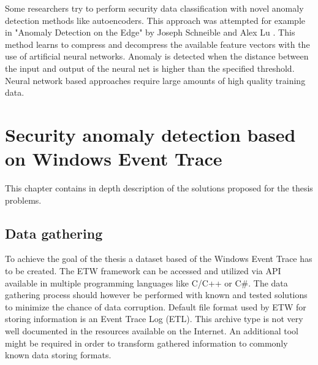 \documentclass[a4paper,twoside,12pt]{book}
\begin{document}
Some researchers try to perform security
data classification with novel anomaly detection methods like autoencoders. This approach was
attempted for example in "Anomaly Detection on the Edge" by Joseph Schneible and Alex Lu
\cite{bib:autoencoderDist}. This method learns to compress and decompress the available feature 
vectors with the use of artificial neural networks. Anomaly is detected when the distance 
between the input and output of the neural net is higher than the specified threshold.
Neural network based approaches require large amounts of high quality training data.  


\chapter{Security anomaly detection based on Windows Event Trace}

This chapter contains in depth description of the solutions proposed for the thesis problems. 

\section{Data gathering}

To achieve the goal of the thesis a dataset based of the Windows Event Trace has to 
be created. The ETW framework can be accessed and utilized via API available in multiple
programming languages like C/C++\cite{bib:etwcpp} or C\#\cite{bib:etwcsharp}. The 
data gathering process should however be performed with known and tested solutions to
minimize the chance of data corruption. Default file format used by ETW for storing 
information is an Event Trace Log (ETL). This archive type is not very well documented in 
the resources available on the Internet. An additional tool might be required in order to 
transform gathered information to commonly known data storing formats.
\end{document}
